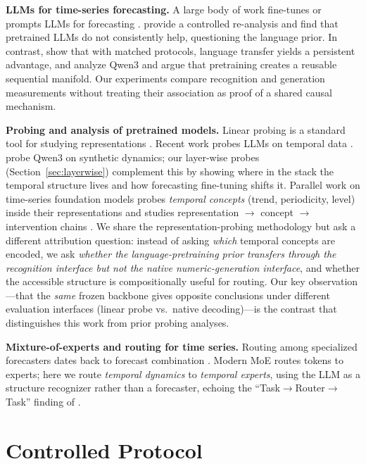 \documentclass{article}
\begin{document}
\textbf{LLMs for time-series forecasting.}  A large body of work fine-tunes or
prompts LLMs for forecasting \citep{gruver2023large,time-llm2023,qwen-time,
new2022,zhou2024one}.  \citet{tan2024are} provide a controlled re-analysis and
find that pretrained LLMs do not consistently help, questioning the language
prior.  In contrast, \citet{randominit2025} show that with matched protocols,
language transfer yields a persistent advantage, and \citet{manifold2026}
analyze Qwen3 and argue that pretraining creates a reusable sequential
manifold.  Our experiments compare recognition and generation measurements
without treating their association as proof of a shared causal mechanism.

\textbf{Probing and analysis of pretrained models.}  Linear probing is a
standard tool for studying representations \citep{alain2016understanding,
beldon2018measuring}.  Recent work probes LLMs on temporal data
\citep{liu2024pre-training,tan2024are}.  \citet{manifold2026} probe Qwen3 on
synthetic dynamics; our layer-wise probes (Section~\ref{sec:layerwise})
complement this by showing where in the stack the temporal structure lives and
how forecasting fine-tuning shifts it.  Parallel work on time-series
foundation models probes \emph{temporal concepts} (trend, periodicity, level)
inside their representations and studies representation $\to$ concept $\to$
intervention chains \citep{tsfm_probe2025,tsfm_intervention2025}.  We share
the representation-probing methodology but ask a different attribution
question: instead of asking \emph{which} temporal concepts are encoded, we ask
\emph{whether the language-pretraining prior transfers through the
recognition interface but not the native numeric-generation interface}, and
whether the accessible structure is compositionally useful for routing.  Our
key observation---that the \emph{same} frozen backbone gives opposite
conclusions under different evaluation interfaces (linear probe vs.\ native
decoding)---is the contrast that distinguishes this work from prior probing
analyses.

\textbf{Mixture-of-experts and routing for time series.}  Routing among
specialized forecasters dates back to forecast combination
\citep{bates1969combination}.  Modern MoE \citep{shazeer2017outrageously}
routes tokens to experts; here we route \emph{temporal dynamics} to
\emph{temporal experts}, using the LLM as a structure recognizer rather than a
forecaster, echoing the ``Task$\to$Router$\to$Task'' finding of
\citet{waveTLM2025}.

\section{Controlled Protocol}\label{sec:protocol}
\end{document}
